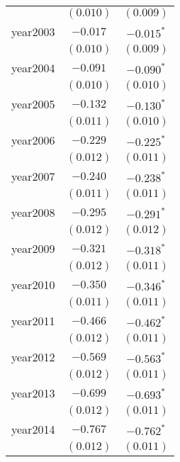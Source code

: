 \begin{center}
\begin{longtable}{l c c}
                      & $(0.010)$     & $(0.009)$             \\
year2003              & $-0.017$      & $\mathbf{-0.015}^{*}$ \\
                      & $(0.010)$     & $(0.009)$             \\
year2004              & $-0.091$      & $\mathbf{-0.090}^{*}$ \\
                      & $(0.010)$     & $(0.010)$             \\
year2005              & $-0.132$      & $\mathbf{-0.130}^{*}$ \\
                      & $(0.011)$     & $(0.010)$             \\
year2006              & $-0.229$      & $\mathbf{-0.225}^{*}$ \\
                      & $(0.012)$     & $(0.011)$             \\
year2007              & $-0.240$      & $\mathbf{-0.238}^{*}$ \\
                      & $(0.011)$     & $(0.011)$             \\
year2008              & $-0.295$      & $\mathbf{-0.291}^{*}$ \\
                      & $(0.012)$     & $(0.012)$             \\
year2009              & $-0.321$      & $\mathbf{-0.318}^{*}$ \\
                      & $(0.012)$     & $(0.011)$             \\
year2010              & $-0.350$      & $\mathbf{-0.346}^{*}$ \\
                      & $(0.011)$     & $(0.011)$             \\
year2011              & $-0.466$      & $\mathbf{-0.462}^{*}$ \\
                      & $(0.012)$     & $(0.011)$             \\
year2012              & $-0.569$      & $\mathbf{-0.563}^{*}$ \\
                      & $(0.012)$     & $(0.011)$             \\
year2013              & $-0.699$      & $\mathbf{-0.693}^{*}$ \\
                      & $(0.012)$     & $(0.011)$             \\
year2014              & $-0.767$      & $\mathbf{-0.762}^{*}$ \\
                      & $(0.012)$     & $(0.011)$             \\

\end{longtable}
\end{center}
